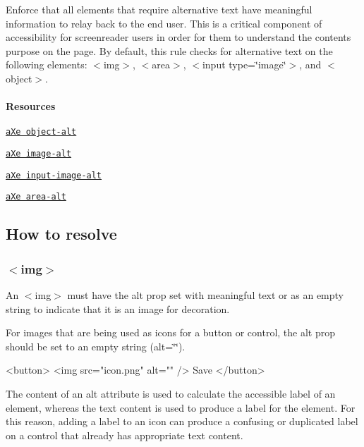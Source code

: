 Enforce that all elements that require alternative text have meaningful information to relay back to the end user. This is a critical component of accessibility for screenreader users in order for them to understand the content\textquotesingle{}s purpose on the page. By default, this rule checks for alternative text on the following elements\+: {\ttfamily $<$img$>$}, {\ttfamily $<$area$>$}, {\ttfamily $<$input type=\char`\"{}image\char`\"{}$>$}, and {\ttfamily $<$object$>$}.

\paragraph*{Resources}


\begin{DoxyEnumerate}
\item \href{https://dequeuniversity.com/rules/axe/2.1/object-alt}{\tt a\+Xe object-\/alt}
\item \href{https://dequeuniversity.com/rules/axe/2.1/image-alt}{\tt a\+Xe image-\/alt}
\item \href{https://dequeuniversity.com/rules/axe/2.1/input-image-alt}{\tt a\+Xe input-\/image-\/alt}
\item \href{https://dequeuniversity.com/rules/axe/2.1/area-alt}{\tt a\+Xe area-\/alt}
\end{DoxyEnumerate}

\subsection*{How to resolve}

\subsubsection*{{\ttfamily $<$img$>$}}

An {\ttfamily $<$img$>$} must have the {\ttfamily alt} prop set with meaningful text or as an empty string to indicate that it is an image for decoration.

For images that are being used as icons for a button or control, the {\ttfamily alt} prop should be set to an empty string ({\ttfamily alt=\char`\"{}\char`\"{}}).


\begin{DoxyCode}
<button>
  <img src="icon.png" alt="" />
  Save
</button>
\end{DoxyCode}
 The content of an {\ttfamily alt} attribute is used to calculate the accessible label of an element, whereas the text content is used to produce a label for the element. For this reason, adding a label to an icon can produce a confusing or duplicated label on a control that already has appropriate text content.

